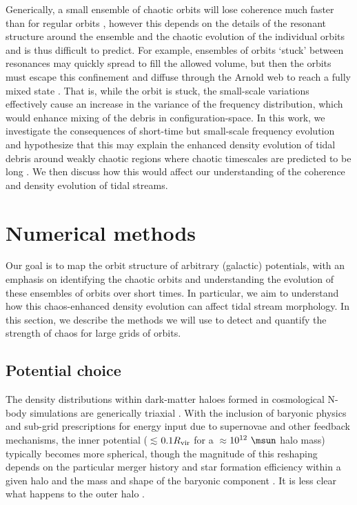 Generically, a small ensemble of chaotic orbits will lose coherence much faster
than for regular orbits \cite[see, e.g.,][]{kandrup94, merritt96, kandrup03},
however this depends on the details of the resonant structure around the
ensemble and the chaotic evolution of the individual orbits and is thus
difficult to predict. For example, ensembles of orbits `stuck' between
resonances may quickly spread to fill the allowed volume, but then the orbits
must escape this confinement and diffuse through the Arnold web to reach a fully
mixed state \citep{merritt96}. That is, while the orbit is stuck, the
small-scale variations effectively cause an increase in the variance of the
frequency distribution, which would enhance mixing of the debris in
configuration-space. In this work, we investigate the consequences of short-time
but small-scale frequency evolution and hypothesize that this may explain the
enhanced density evolution of tidal debris around weakly chaotic regions where
chaotic timescales are predicted to be long \citep[e.g.,][]{pearson15}. We then
discuss how this would affect our understanding of the coherence and density
evolution of tidal streams.

\section{Numerical methods}\label{sec:methods}

Our goal is to map the orbit structure of arbitrary (galactic) potentials, with
an emphasis on identifying the chaotic orbits and understanding the evolution of
these ensembles of orbits over short times. In particular, we aim to understand
how this chaos-enhanced density evolution can affect tidal stream morphology. In
this section, we describe the methods we will use to detect and quantify the
strength of chaos for large grids of orbits.

\subsection{Potential choice}\label{sec:potential}

The density distributions within dark-matter haloes formed in cosmological
N-body simulations are generically triaxial \citep[e.g.,][]{jing02, bett07,
zemp09, veraciro11}. With the inclusion of baryonic physics and sub-grid
prescriptions for energy input due to supernovae and other feedback mechanisms,
the inner potential ($\lesssim$$0.1R_{\rm vir}$ for a $\approx$$10^{12}~\msun$
halo mass) typically becomes more spherical, though the magnitude of this
reshaping depends on the particular merger history and star formation efficiency
within a given halo and the mass and shape of the baryonic component
\citep[e.g.,][though in Milky Way-like galaxies, baryonic disks will add
non-sphericity to the total potential]{dubinski94,kazantzidis04, debattista08,
bryan13, butsky15}. It is less clear what happens to the outer halo
\citep[e.g.,][]{zemp11, valluri13}.

